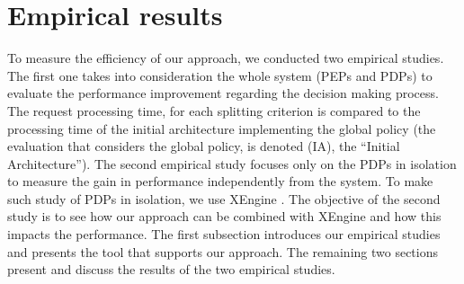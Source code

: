 \section{Empirical results} \label{sec:experiment}
To measure the efficiency of our approach, we conducted two empirical studies. The first one takes into consideration the whole system 
(PEPs and PDPs) to evaluate the performance improvement regarding the decision making process. The request processing time, 
for each splitting criterion is compared to the processing time of the initial architecture implementing the global policy (the evaluation 
that considers the global policy, is denoted (IA), the ``Initial Architecture''). The second empirical study focuses only on the PDPs in isolation to measure the gain in performance
 independently from the system. To make such study of PDPs in isolation, we use XEngine \cite{Xengine}. The objective of the second study is to see how our approach can be 
combined with XEngine and how this impacts the performance. The first subsection introduces our empirical studies and presents the tool that supports our approach. The remaining two 
sections present and discuss the results of the two empirical studies.  

